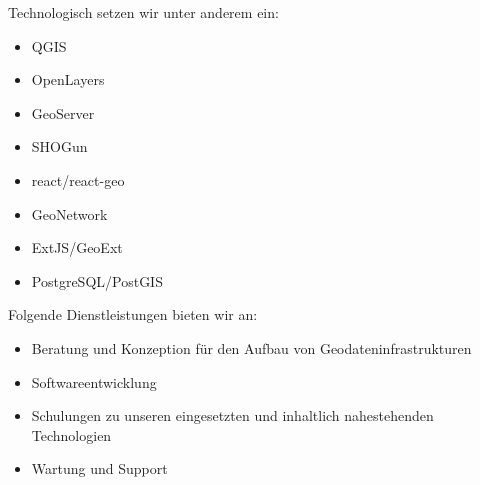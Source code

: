 Technologisch setzen wir unter anderem ein:
\vspace{-0.5\baselineskip}
\begin{multicols}{2}
  \RaggedRight
\begin{itemize}
  \setlength{\itemsep}{-0.2\baselineskip}
\item QGIS
\item OpenLayers
\item GeoServer
\item SHOGun
\item react/react-geo
\item GeoNetwork
\item ExtJS/GeoExt
\item PostgreSQL/PostGIS
\end{itemize}
\end{multicols}
\vspace{-0.5\baselineskip}

Folgende Dienstleistungen bieten wir an:
\begin{itemize}
  \setlength{\itemsep}{-0.2\baselineskip}
  \item Beratung und Konzeption für den Aufbau von Geodateninfrastrukturen
  \item Softwareentwicklung
  \item Schulungen zu unseren eingesetzten und inhaltlich nahestehenden Technologien
  \item Wartung und Support 
\end{itemize}
